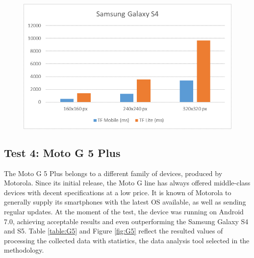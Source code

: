 \begin{figure}[p]
  \includegraphics[width=\linewidth]{img/charts/S4.png}
  \label{fig:S4}
\end{figure}

\subsection{Test 4: Moto G 5 Plus}
The Moto G 5 Plus belongs to a different family of devices, produced by Motorola. Since its initial release, the Moto G line has always offered middle-class devices with decent specifications at a low price. It is known of Motorola to generally supply its smartphones with the latest OS available, as well as sending regular updates. At the moment of the test, the device was running on Android 7.0, achieving acceptable results and even outperforming the Samsung Galaxy S4 and S5. Table \ref{table:G5} and Figure \ref{fig:G5} reflect the resulted values of processing the collected data with statistics, the data analysis tool selected in the methodology. \\

